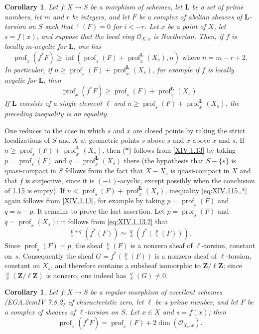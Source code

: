 \documentclass[11pt,a4paper,oneside]{book}
\providecommand{\pageoriginale}{%
  \refstepcounter{pageoriginal}%
  \marginpar{\raggedright\footnotesize\bfseries\thepageoriginal}%
  \xspace}
\providecommand{\EGA}{\textup{EGA}\kern.2em}
\providecommand{\Oo}{\mathcal O}
\providecommand{\LL}{\mathbf L}
\providecommand{\ZZ}{\mathbf Z}
\providecommand{\h}{\mathop{\underline{H}}\nolimits}
\providecommand{\prof}{\operatorname{prof}}
\theoremstyle{plain}
\newtheorem{corollaire}[subsection]{Corollary}
\theoremstyle{definition}
\theoremstyle{remark}
\renewcommand{\Ref}[1]{\textup{\ref{#1}}}
\begin{document}
\begin{corollaire} \label{XIV.1.15}
Let $f:X\to S$ be a morphism of schemes, let $\LL$ be a set of prime numbers, let $m$ and $r$ be integers, and let $F$ be a complex of abelian sheaves of $\LL$-torsion on $S$ such that $\h^i(F)=0$ for $i<-r$. Let $x$ be a point of $X$, let $s=f(x)$, and suppose that the local ring $\Oo_{X,x}$ is Noetherian. Then, if $f$ is locally $m$-acyclic for $\LL$, one has
\begin{equation*} \label{eq:XIV.115..*} \tag{$*$} {\prof_x(f^*F)\geq\inf(\prof_s(F)+\prof^\LL_x(X_s), n)\text{ where }n=m-r+2.}
\end{equation*}
In particular, if $n\geq\prof_s(F)+\prof_x^\LL(X_s)$, for example if $f$ is locally acyclic for $\LL$, then
\begin{equation*} \label{eq:XIV.15.**} \tag{$**$} {\prof_x(f^*F)\geq\prof_s(F)+\prof_x^\LL(X_s).}
\end{equation*}
If $\LL$ consists of a single element $\ell$ and $n\geq \prof_s(F)+\prof_x^\LL(X_s)$, the preceding inequality is an equality.
\end{corollaire}

One reduces to the case in which $s$ and $x$ are closed points by taking the strict localizations of $S$ and $X$ at geometric points $\bar s$ above $s$ and $\bar x$ above $x$ and $\bar s$. If $n\geq\prof_s(F)+\prof_x^\LL(X_s)$, then ($*$) follows from \Ref{XIV.1.13} by taking $p=\prof_s(F)$ and $q=\prof_x^\LL(X_s)$ there (the hypothesis that $S-\{s\}$ is quasi-compact in $S$ follows from the fact that $X-X_s$ is quasi-compact in $X$ and that $f$ is surjective, since it is $(-1)$-acyclic, except possibly when the conclusion of \hyperref[XIV.1.15]{1.15} is empty). If $n<\prof_s(F)+\prof_x^\LL(X_s)$, inequality \eqref{eq:XIV.115..*} again follows from \Ref{XIV.1.13}, for example by taking $p=\prof_s(F)$ and $q=n-p$. It remains to prove\pageoriginale the last assertion. Let $p=\prof_s(F)$ and $q=\prof_x(X_s)$; it follows from \eqref{eq:XIV.1.13.2} that
$$
\h_x^{p+q}(f^*(F))\simeq \h_x^q(f^*(\h^p_s(F))).
$$
Since $\prof_s(F)=p$, the sheaf $\h^p_s(F)$ is a nonzero sheaf of $\ell$-torsion, constant on~$s$. Consequently the sheaf $G=f^*(\h_s^p(F))$ is a nonzero sheaf of $\ell$-torsion, constant on $X_s$, and therefore contains a subsheaf isomorphic to $\ZZ/\ell\ZZ$; since $\h_x^q(\ZZ/\ell\ZZ)$ is nonzero, one indeed has $\h_x^q(G)\neq 0$.

\begin{corollaire} \label{XIV.1.16}
Let $f:X\to S$ be a regular morphism of excellent schemes (\textup{\EGA IV 7.8.2}) of characteristic zero, let $\ell$ be a prime number, and let $F$ be a complex of sheaves of $\ell$-torsion on $S$. Let $x\in X$ and $s=f(x)$; then
$$
\prof_x(f^*F)=\prof_s(F)+2\dim(\Oo_{X_s,x}).
$$
\end{corollaire}
\end{document}
